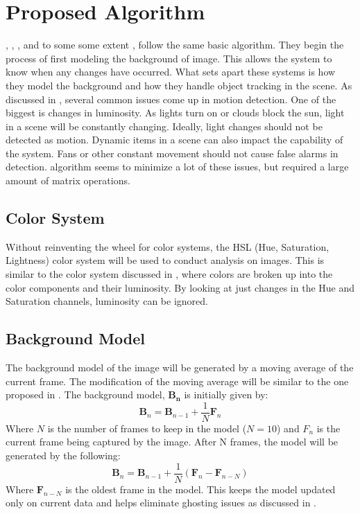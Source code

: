 \documentclass[journal]{IEEEtran}
\begin{document}
    \section{Proposed Algorithm}
    \cite{Gaba}, \cite{Jain}, \cite{Oliver}, and to some some extent \cite{Jain}, follow the same basic algorithm.
    They begin the process of first modeling the background of image. This allows the system to know
    when any changes have occurred. What sets apart these systems is how they model the background and how they
    handle object tracking in the scene. As discussed in \cite{Sing}, several common issues come up in motion detection. One of the
    biggest is changes in luminosity. As lights turn on or clouds block the sun, light in a scene will be constantly changing.
    Ideally, light changes should not be detected as motion. Dynamic items in a scene can also impact the capability of the system.
    Fans or other constant movement should not cause false alarms in detection. \cite{Oliver} algorithm seems to minimize a lot of these
    issues, but required a large amount of matrix operations.

    \subsection{Color System}
    Without reinventing the wheel for color systems, the HSL (Hue, Saturation, Lightness) color system will be used to conduct
    analysis on images. This is similar to the color system discussed in \cite{Gaba}, where colors are broken up into the color
    components and their luminosity. By looking at just changes in the Hue and Saturation channels, luminosity can be ignored.

    \subsection{Background Model}
    The background model of the image will be generated by a moving average of the current frame. The modification of the
    moving average will be similar to the one proposed in \cite{Gaba}. The background model, $\mathbf{B_n}$ is initially given by:
    $$
    \mathbf{B}_n = \mathbf{B}_{n-1} + \frac{1}{N}\mathbf{F}_n
    $$
    Where $N$ is the number of frames to keep in the model ($N=10$) and $\mathbf{}{F_n}$ is the current frame being captured by the image. After N frames, the model will be generated by the following:
    $$
    \mathbf{B}_n = \mathbf{B}_{n-1} + \frac{1}{N}(\mathbf{F}_n - \mathbf{F}_{n-N})
    $$
    Where $ \mathbf{F}_{n-N}$ is the oldest frame in the model. This keeps the model updated only on current data and helps eliminate
    ghosting issues as discussed in \cite{Sing}.
\end{document}
